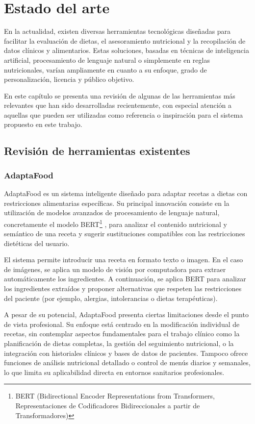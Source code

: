\chapter{Estado del arte}\label{capitulo2}
En la actualidad, existen diversas herramientas tecnológicas diseñadas para facilitar la evaluación de dietas, el asesoramiento nutricional y la recopilación de datos clínicos y alimentarios. Estas soluciones, basadas en técnicas de inteligencia artificial, procesamiento de lenguaje natural o simplemente en reglas nutricionales, varían ampliamente en cuanto a su enfoque, grado de personalización, licencia y público objetivo.

En este capítulo se presenta una revisión de algunas de las herramientas más relevantes que han sido desarrolladas recientemente, con especial atención a aquellas que pueden ser utilizadas como referencia o inspiración para el sistema propuesto en este trabajo.

\section{Revisión de herramientas existentes}
\subsection{AdaptaFood\cite{MoralesGarzon2025}}
AdaptaFood es un sistema inteligente diseñado para adaptar recetas a dietas con restricciones alimentarias específicas. Su principal innovación consiste en la utilización de modelos avanzados de procesamiento de lenguaje natural, concretamente el modelo BERT\footnote{BERT (Bidirectional Encoder Representations from Transformers, Representaciones de Codificadores Bidireccionales a partir de Transformadores)} , para analizar el contenido nutricional y semántico de una receta y sugerir sustituciones compatibles con las restricciones dietéticas del usuario.

El sistema permite introducir una receta en formato texto o imagen. En el caso de imágenes, se aplica un modelo de visión por computadora para extraer automáticamente los ingredientes. A continuación, se aplica BERT para analizar los ingredientes extraídos y proponer alternativas que respeten las restricciones del paciente (por ejemplo, alergias, intolerancias o dietas terapéuticas).

A pesar de su potencial, AdaptaFood presenta ciertas limitaciones desde el punto de vista profesional. Su enfoque está centrado en la modificación individual de recetas, sin contemplar aspectos fundamentales para el trabajo clínico como la planificación de dietas completas, la gestión del seguimiento nutricional, o la integración con historiales clínicos y bases de datos de pacientes. Tampoco ofrece funciones de análisis nutricional detallado o control de menús diarios y semanales, lo que limita su aplicabilidad directa en entornos sanitarios profesionales.

